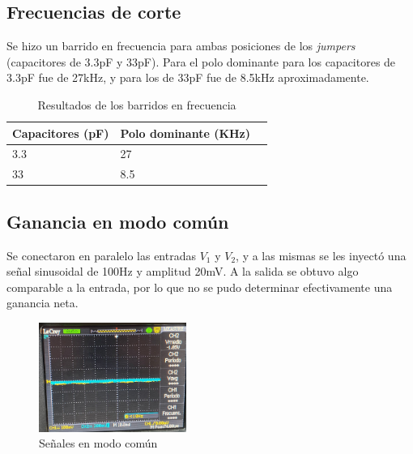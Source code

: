 \documentclass[letterpaper, 10 pt, conference]{ieeeconf}  %
\begin{document}
\subsection{Frecuencias de corte}
Se hizo un barrido en frecuencia para ambas posiciones de los \textit{jumpers} (capacitores de 3.3pF y 33pF). Para el polo dominante para los capacitores de 3.3pF fue de 27kHz, y para los de 33pF fue de 8.5kHz aproximadamente.
\begin{table}[H]
  \centering
  \begin{tabular}{|l|l|l|}
    \hline
    Capacitores (pF)  & Polo dominante (KHz)  \\ \hline
    3.3               & 27                    \\ \hline
    33                & 8.5                   \\ \hline
  \end{tabular}
  \caption{Resultados de los barridos en frecuencia}
  \label{tab:result_barr_frec}
\end{table}

\subsection{Ganancia en modo común}
Se conectaron en paralelo las entradas $V_{1}$ y $V_{2}$, y a las mismas se les inyectó una señal sinusoidal de 100Hz y amplitud 20mV. A la salida se obtuvo algo comparable a la entrada, por lo que no se pudo determinar efectivamente una ganancia neta.
\begin{figure}[H]
  \centering
  \includegraphics[width=0.43\textwidth]{./Imagenes/ganacia_modo_comun.png}
  \caption{Señales en modo común}
  \label{pic:ganancia_modo_comun}
\end{figure}
\end{document}
